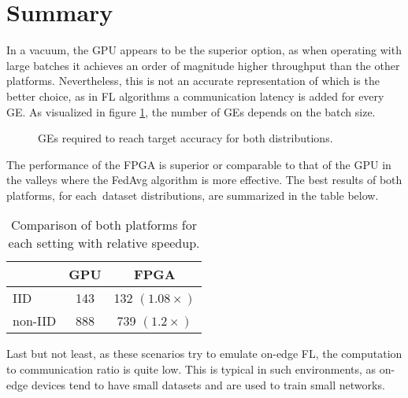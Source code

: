 \section{Summary}
In a vacuum, the GPU appears to be the superior option, as when operating with large batches it achieves an order of magnitude higher throughput than the other platforms. Nevertheless, this is not an accurate representation of which is the better choice, as in FL algorithms a communication latency is added for every GE. As visualized in figure \ref{fig: GEs per batch size, IID and nonIID}, the number of GEs depends on the batch size.
\begin{figure}[H]
    \center
    \caption[ GEs per batch size, IID and nonIID distribution ]{ GEs required to reach target accuracy for both distributions. }
    \label{fig: GEs per batch size, IID and nonIID}
\end{figure}

The performance of the FPGA is superior or comparable to that of the GPU in the valleys where the FedAvg algorithm is more effective. The best results of both platforms, for each dataset distributions, are summarized in the table below.
\begin{table}[H]
    \center
    \begin{tabular}
        { l c c }
        \hline
                & GPU & FPGA\\\hline
        IID     & 143 & 132 $(1.08\times)$\\
        non-IID & 888 & 739 $(1.2\times)$\\\hline
    \end{tabular}
    \caption[Best Results]{Comparison of both platforms for each setting with relative speedup.}
    \label{table: Best Results}
\end{table}

Last but not least, as these scenarios try to emulate on-edge FL, the computation to communication ratio is quite low. This is typical in such environments, as on-edge devices tend to have small datasets and are used to train small networks.